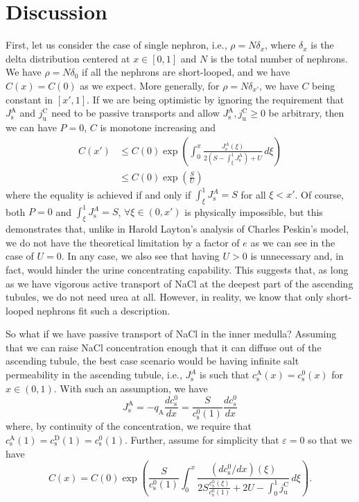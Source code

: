 \documentclass{article}
\begin{document}
\section{Discussion}

First, let us consider the case of single nephron, i.e., $\rho = N\delta_x$, where $\delta_x$ is the delta distribution centered at $x\in [0,1]$ and $N$ is the total number of nephrons.
We have $\rho = N\delta_0$ if all the nephrons are short-looped, and we have $C(x) = C(0)$ as we expect.
More generally, for $\rho = N\delta_{x'}$, we have $C$ being constant in $[x',1]$.
If we are being optimistic by ignoring the requirement that $J_\mathrm{s}^\mathrm{A}$ and $j_\mathrm{u}^\mathrm{C}$ need to be passive transports and allow $J_\mathrm{s}^\mathrm{A},j_\mathrm{u}^\mathrm{C}\geq 0$ be arbitrary, then we can have $P=0$, $C$ is monotone increasing and
\begin{equation}
    \begin{split}
        C(x') &\leq C(0)\exp\left( \int_0^x\frac{J_\mathrm{s}^A(\xi)}{ 2\left( S-\int_\xi^1J_\mathrm{s}^\mathrm{A} \right)+U}\,d\xi \right)\\
        &\leq C(0)\exp\left( \frac{S}{U} \right)
    \end{split}
\end{equation}
    where the equality is achieved if and only if $\int_\xi^1 J_\mathrm{s}^A = S$ for all $\xi<x'$.
Of course, both $P=0$ and $\int_\xi^1 J_\mathrm{s}^A = S$, $\forall \xi\in (0,x')$ is physically impossible, but this demonstrates that, unlike in Harold Layton's analysis of Charles Peskin's model, we do not have the theoretical limitation by a factor of $e$ as we can see in the case of $U=0$.
In any case, we also see that having $U>0$ is unnecessary and, in fact, would hinder the urine concentrating capability.
This suggests that, as long as we have vigorous active transport of NaCl at the deepest part of the ascending tubules, we do not need urea at all.
However, in reality, we know that only short-looped nephrons fit such a description.

So what if we have passive transport of NaCl in the inner medulla?
Assuming that we can raise NaCl concentration enough that it can diffuse out of the ascending tubule, the best case scenario would be having infinite salt permeability in the ascending tubule, i.e., $J_\mathrm{s}^A$ is such that $c_\mathrm{s}^\mathrm{A}(x) = c_\mathrm{s}^0(x)$ for $x\in (0,1)$.
With such an assumption, we have
\begin{equation}
    J_\mathrm{s}^\mathrm{A} = -q_\mathrm{A}\frac{d c_\mathrm{s}^0}{dx} = \frac{S}{c_\mathrm{s}^0(1)}\frac{dc_s^0}{dx}
\end{equation}
    where, by continuity of the concentration, we require that $c_\mathrm{s}^\mathrm{A}(1) = c_\mathrm{s}^\mathrm{D}(1) = c_\mathrm{s}^0(1)$.
Further, assume for simplicity that $\varepsilon = 0$ so that we have
\begin{equation}
    C(x) = C(0)\exp\left( \frac{S}{c_\mathrm{s}^0(1)}\int_0^x\frac{(dc_\mathrm{s}^0/dx)(\xi)}{2 S\frac{c_\mathrm{s}^0(\xi)}{c_\mathrm{s}^0(1)}+2U - \int_0^1 j_\mathrm{u}^\mathrm{C}} \,d\xi\right).
\end{equation}
\end{document}
